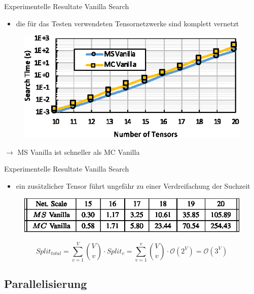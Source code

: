 \documentclass{beamer}
\begin{document}
\begin{frame}{Experimentelle Resultate Vanilla Search}
	\begin{itemize}
		\item die für das Testen verwendeten Tensornetzwerke sind komplett vernetzt
	\end{itemize}
	\begin{figure}
		\includegraphics{figure_08}
	\end{figure} \pause
	$\rightarrow$ MS Vanilla ist schneller als MC Vanilla
\end{frame}

\begin{frame}{Experimentelle Resultate Vanilla Search}
	\begin{itemize}
		\item ein zusätzlicher Tensor führt ungefähr zu einer Verdreifachung der Suchzeit
	\end{itemize}
	\begin{figure}
		\includegraphics{table_02}
	\end{figure}
	\begin{equation*}
		Split_{total} = \sum^V_{v=1} \binom{V}{v} \cdot Split_v = \sum^v_{v=1} \binom{V}{v} \cdot \mathcal{O} \left(2^V \right) = \mathcal{O} \left(3^V \right)
	\end{equation*}
\end{frame}

\subsection{Parallelisierung}
\end{document}

